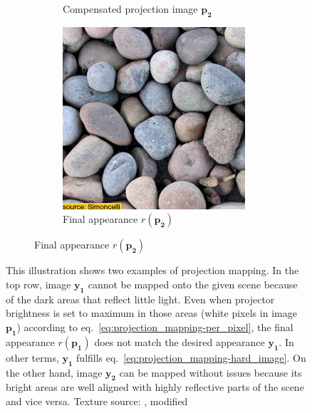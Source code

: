\begin{figure}[ht]
\begin{subfigure}{\textwidth}
\begin{subfigure}{0.2\textwidth}
            \caption*{Compensated projection image \(\bm{p_2}\)}
            \label{fig:intro_pixels_vs_stats-stats_opt}
        \end{subfigure}
        \hfill
        \begin{subfigure}{0.2\textwidth}
            \centering
            \includegraphics[width=\textwidth]{images/01-pixels_vs_stats-stats_proj.jpg}
            \caption*{Final appearance \(r(\bm{p_2})\)}
            \label{fig:intro_pixels_vs_stats-stats_proj}
        \end{subfigure}
    \end{subfigure}
    \caption{This illustration shows two examples of projection mapping. In the top row, image \(\bm{y_1}\) cannot be mapped onto the given scene because of the dark areas that reflect little light. Even when projector brightness is set to maximum in those areas (white pixels in image \(\bm{p_1}\)) according to eq.~\ref{eq:projection_mapping-per_pixel}, the final appearance \(r(\bm{p_1})\) does not match the desired appearance \(\bm{y_1}\). In other terms, \(\bm{y_1}\) fulfills eq.~\ref{eq:projection_mapping-hard_image}. On the other hand, image \(\bm{y_2}\) can be mapped without issues because its bright areas are well aligned with highly reflective parts of the scene and vice versa. Texture source: \citet{Gatys2015}, modified}
    \label{fig:intro_pixels_vs_stats}
\end{figure}

